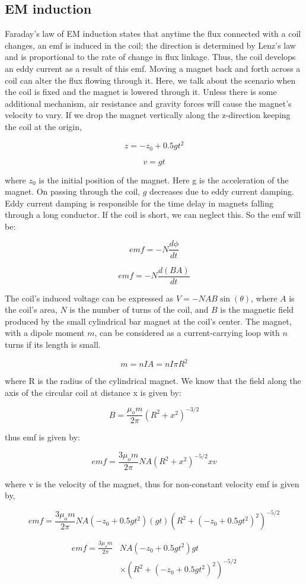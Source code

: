	\subsection{EM induction}
		Faraday's law of EM induction states that anytime the flux connected with a coil changes, an emf is induced in the coil; the direction is determined by Lenz's law and is proportional to the rate of change in flux linkage. Thus, the coil develops an eddy current as a result of this emf. Moving a magnet back and forth across a coil can alter the flux flowing through it. Here, we talk about the scenario when the coil is fixed and the magnet is lowered through it. Unless there is some additional mechanism, air resistance and gravity forces will cause the magnet's velocity to vary. If we drop the magnet vertically along the z-direction keeping the coil at the origin,

		$$z=-z_0+ 0.5gt^2$$

		$$v=gt$$

		where $z_0$ is the initial position of the magnet. Here g is the acceleration of the magnet. On passing through the coil, $g$ decreases due to eddy current damping. Eddy current damping is responsible for the time delay in magnets falling through a long conductor. If the coil is short, we can neglect this. So the emf will be:

		$$emf=-N\frac{d\phi}{dt}$$

		$$emf=-N\frac{d(BA)}{dt}$$

		The coil's induced voltage can be expressed as $V = -NAB\sin(\theta)$, where $A$ is the coil's area, $N$ is the number of turns of the coil, and $B$ is the magnetic field produced by the small cylindrical bar magnet at the coil's center. The magnet, with a dipole moment $m$, can be considered as a current-carrying loop with $n$ turns if its length is small.

		$$m = n I A = n I\pi R^2$$

		where R is the radius of the cylindrical magnet. We know that the field along the axis of the circular coil at distance x is given by:

		$$B=\frac{\mu_o m}{2\pi}(R^2+x^2)^{-3/2}$$

		thus emf is given by:

		$$emf=\frac{3\mu_o m}{2\pi}NA(R^2+x^2)^{-5/2}xv$$

		where v is the velocity of the magnet, thus for non-constant velocity emf is given by,

		$$emf=\frac{3\mu_o m}{2\pi}NA(-z_0+ 0.5gt^2)(gt)(R^2+(-z_0+ 0.5gt^2)^2)^{-5/2}$$



		\begin{equation}
			\begin{split}
				emf=\frac{3\mu_o m}{2\pi}&NA(-z_0+ 0.5gt^2)gt\\
										 &\times(R^2+(-z_0+ 0.5gt^2)^2)^{-5/2}
			\end{split}
			\label{eq:4}
		\end{equation}